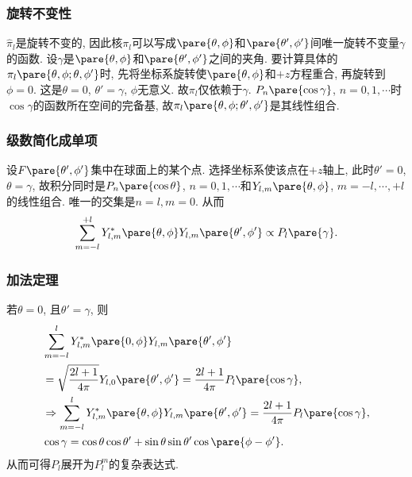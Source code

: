 \documentclass[hidelinks]{ctexart}
\begin{document}

\subsubsection{旋转不变性} %
\label{ssub:旋转不变性}

\newpoint{}$\hat \pi_l$是旋转不变的, 因此核$\pi_l$可以写成$\pare{\theta,\phi}$和$\pare{\theta',\phi'}$间唯一旋转不变量$\gamma$的函数. 设$\gamma$是$\pare{\theta,\phi}$和$\pare{\theta',\phi'}$之间的夹角.
\newpoint{}要计算具体的$\pi_l\pare{\theta,\phi;\theta,\phi'}$时, 先将坐标系旋转使$\pare{\theta,\phi}$和$+z$方程重合, 再旋转到$\phi = 0$. 这是$\theta = 0$, $\theta' = \gamma$, $\phi$无意义. 故$\pi_l$仅依赖于$\gamma$.
\newpoint{}$P_n\pare{\cos\gamma}$, $n=0,1,\cdots$时$\cos\gamma$的函数所在空间的完备基, 故$\pi_l\pare{\theta,\phi;\theta',\phi'}$是其线性组合.


\subsubsection{级数简化成单项} %
\label{ssub:级数简化成单项}

设$F\pare{\theta',\phi'}$集中在球面上的某个点. 选择坐标系使该点在$+z$轴上, 此时$\theta' = 0$, $\theta = \gamma$, 故积分同时是$P_n\pare{\cos\theta}$, $n=0,1,\cdots$和$Y_{l,m}\pare{\theta,\phi}$, $m=-l,\cdots,+l$的线性组合. 唯一的交集是$n=l, m = 0$. 从而
\[ \sum_{m=-l}^{+l} Y^*_{l,m}\pare{\theta,\phi}Y_{l,m}\pare{\theta',\phi'}\propto P_l\pare{\gamma}. \]


\subsubsection{加法定理} %
\label{ssub:加法定理}

若$\theta = 0$, 且$\theta' = \gamma$, 则
\begin{align*}
    &\sum_{m=-l}^l Y^*_{l,m}\pare{0,\phi} Y_{l,m}\pare{\theta',\phi'} \\
    &= \sqrt{\frac{2l+1}{4\pi}}Y_{l,0}\pare{\theta',\phi'} = \frac{2l+1}{4\pi}P_l\pare{\cos\gamma}, \\
    & \Rightarrow \sum_{m=-l}^{l} Y^*_{l,m}\pare{\theta,\phi}Y_{l,m}\pare{\theta',\phi'} = \frac{2l+1}{4\pi} P_l\pare{\cos\gamma}, \\
    & \cos\gamma = \cos\theta \cos\theta' + \sin\theta \sin\theta' \cos\pare{\phi - \phi'}.
\end{align*}
从而可得$P_l$展开为$P_l^m$的复杂表达式.
\end{document}
